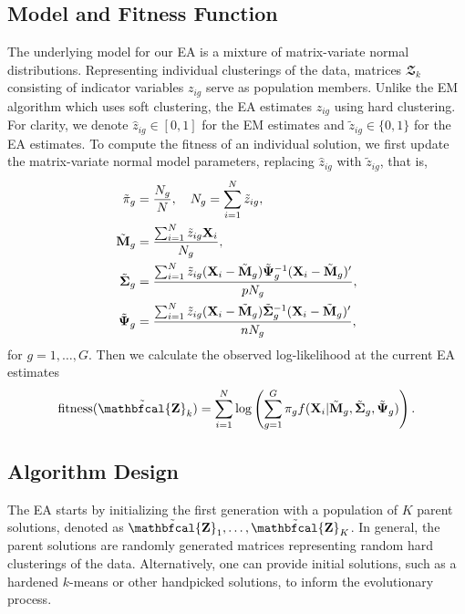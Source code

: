 \documentclass[12pt, centerh1]{article}
\begin{document}
\subsection{Model and Fitness Function}
The underlying model for our EA is a mixture of matrix-variate normal distributions. Representing individual clusterings of the data, matrices $\mathbfcal{Z}_k$ consisting of indicator variables $z_{ig}$ serve as population members. Unlike the EM algorithm which uses soft clustering, the EA estimates $z_{ig}$ using hard clustering. For clarity, we denote $\hat{z}_{ig} \in [0, 1]$ for the EM estimates and $\tilde{z}_{ig} \in \{0, 1\}$ for the EA estimates. To compute the fitness of an individual solution, we first update the matrix-variate normal model parameters, replacing $\hat{z}_{ig}$ with $\tilde{z}_{ig}$, that is,
\[
\begin{aligned}
\tilde{\pi}_g & = \frac{N_g}{N}, \quad N_g = \sum_{i=1}^N \tilde{z}_{ig}, \\
\tilde{{\bf M}}_g & = \frac{\sum_{i=1}^N \tilde{z}_{ig}{\bf X}_i}{N_g}, \\
\tilde{{\bf \Sigma}}_g & = \frac{\sum_{i=1}^N \tilde{z}_{ig}({\bf X}_i - \tilde{\bf M}_g) \tilde{\bf \Psi}_g^{-1}({\bf X}_i - \tilde{\bf M}_g)'}{pN_g}, \\
\tilde{{\bf \Psi}}_g & = \frac{\sum_{i=1}^N \tilde{z}_{ig}({\bf X}_i - \tilde{\bf M}_g) \tilde{\bf \Sigma}_g^{-1}({\bf X}_i - \tilde{\bf M}_g)'}{nN_g},
\end{aligned}
\]
for $g = 1, \dots, G$. Then we calculate the observed log-likelihood at the current EA estimates  
\begin{equation*}
\text{fitness}(\tilde{\bf \mathbfcal{Z}}_k) = \sum_{i=1}^N \log \left (\sum_{g=1}^G\pi_g f({\bf X}_i | \tilde{\bf M}_g, \tilde{\bf \Sigma}_g, \tilde{\bf \Psi}_g)\right).
\end{equation*} 




\subsection{Algorithm Design}
The EA starts by initializing the first generation with a population of $K$ parent solutions, denoted as $\tilde{\bf \mathbfcal{Z}}_1, \dots, \tilde{\bf \mathbfcal{Z}}_K$. In general, the parent solutions are randomly generated matrices representing random hard clusterings of the data. Alternatively, one can provide initial solutions, such as a hardened $k$-means or other handpicked solutions, to inform the evolutionary process.  
\end{document}
